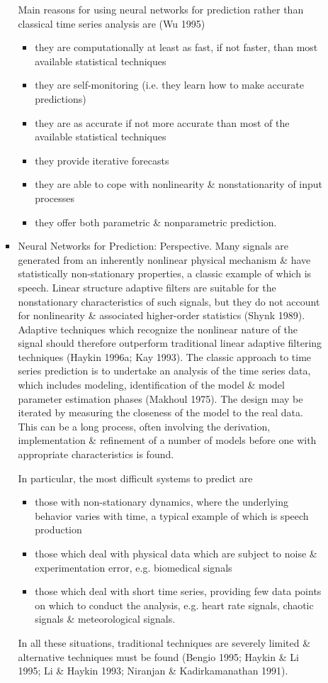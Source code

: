 \documentclass{article}
\begin{document}
\begin{enumerate}
\begin{itemize}
\begin{itemize}
			Main reasons for using neural networks for prediction rather than classical time series analysis are (Wu 1995)
			\begin{itemize}
				\item they are computationally at least as fast, if not faster, than most available statistical techniques
				\item they are self-monitoring (i.e. they learn how to make accurate predictions)
				\item they are as accurate if not more accurate than most of the available statistical techniques
				\item they provide iterative forecasts
				\item they are able to cope with nonlinearity \& nonstationarity of input processes
				\item they offer both parametric \& nonparametric prediction.
			\end{itemize}
			\item {\sf Neural Networks for Prediction: Perspective.} Many signals are generated from an inherently nonlinear physical mechanism \& have statistically non-stationary properties, a classic example of which is speech. Linear structure adaptive filters are suitable for the nonstationary characteristics of such signals, but they do not account for nonlinearity \& associated higher-order statistics (Shynk 1989). Adaptive techniques which recognize the nonlinear nature of the signal should therefore outperform traditional linear adaptive filtering techniques (Haykin 1996a; Kay 1993). The classic approach to time series prediction is to undertake an analysis of the time series data, which includes modeling, identification of the model \& model parameter estimation phases (Makhoul 1975). The design may be iterated by measuring the closeness of the model to the real data. This can be a long process, often involving the derivation, implementation \& refinement of a number of models before one with appropriate characteristics is found.
			
			In particular, the most difficult systems to predict are
			\begin{itemize}
				\item those with non-stationary dynamics, where the underlying behavior varies with time, a typical example of which is speech production
				\item those which deal with physical data which are subject to noise \& experimentation error, e.g. biomedical signals
				\item those which deal with short time series, providing few data points on which to conduct the analysis, e.g. heart rate signals, chaotic signals \& meteorological signals.				
			\end{itemize}
			In all these situations, traditional techniques are severely limited \& alternative techniques must be found (Bengio 1995; Haykin \& Li 1995; Li \& Haykin 1993; Niranjan \& Kadirkamanathan 1991).
			

\end{itemize}
\end{itemize}
\end{enumerate}
\end{document}
